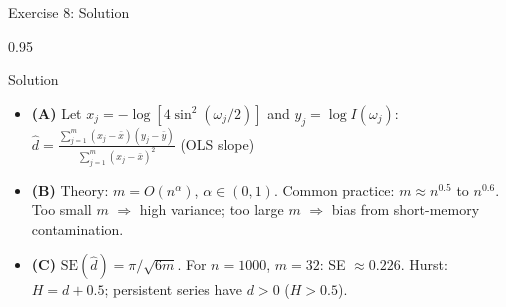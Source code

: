 \documentclass[9pt, aspectratio=169, t]{beamer}
\begin{document}
\begin{frame}{Exercise 8: Solution}
    \begin{cminipage}{0.95\textwidth}
    \begin{exampleblock}{Solution}
        {\footnotesize
        \begin{itemize}\setlength{\itemsep}{3pt}
            \item \textcolor{MainBlue}{\textbf{(A)}} Let $x_j = -\log[4\sin^2(\omega_j/2)]$ and $y_j = \log I(\omega_j)$:
                $\hat{d} = \frac{\sum_{j=1}^m (x_j - \bar{x})(y_j - \bar{y})}{\sum_{j=1}^m (x_j - \bar{x})^2}$ \quad (OLS slope)
            \item \textcolor{MainBlue}{\textbf{(B)}} Theory: $m = O(n^\alpha)$, $\alpha \in (0,1)$. Common practice: $m \approx n^{0.5}$ to $n^{0.6}$. Too small $m$ $\Rightarrow$ high variance; too large $m$ $\Rightarrow$ bias from short-memory contamination.
            \item \textcolor{MainBlue}{\textbf{(C)}} $\text{SE}(\hat{d}) = \pi/\sqrt{6m}$. For $n=1000$, $m=32$: SE $\approx 0.226$. Hurst: $H = d + 0.5$; persistent series have $d>0$ ($H>0.5$).
        \end{itemize}
        }
    \end{exampleblock}
    \end{cminipage}
\end{frame}
\end{document}
